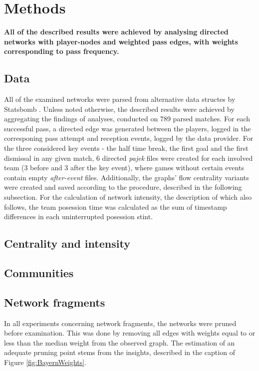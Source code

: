 \documentclass[9pt,twocolumn,twoside]{pnas-report}
\begin{document}
{\small\section*{Methods}

{\bf All of the described results were achieved by analysing directed networks with player-nodes and weighted pass edges, with weights corresponding to pass frequency.} 

\subsection*{Data}
All of the examined networks were parsed from alternative data structes by Statsbomb \cite{statsbomb}. Unless noted otherwise, the described results were achieved by aggregating the findings of analyses, conducted on 789 parsed matches. For each successful pass, a directed edge was generated between the players, logged in the corresponing pass attempt and reception events, logged by the data provider. For the three considered key events - the half time break, the first goal and the first dismissal in any given match, 6 directed \textit{pajek} files were created for each involved team (3 before and 3 after the key event), where games without certain events contain empty \textit{after-event} files. Additionally, the graphs' flow centrality variants were created and saved according to the procedure, described in the following subsection. For the calculation of network intensity, the description of which also follows, the team posession time was calculated as  the sum of timestamp differences in each uninterrupted posession stint.

\subsection*{Centrality and intensity}
\subsection*{Communities}
\subsection*{Network fragments}
In all experiments concerning network fragments, the networks were pruned before examination. This was done by removing all edges with weights equal to or less than the median weight from the observed graph. The estimation of an adequate pruning point stems from the insights, described in the caption of Figure \ref{fig:BayernWeights}.

}
\end{document}
